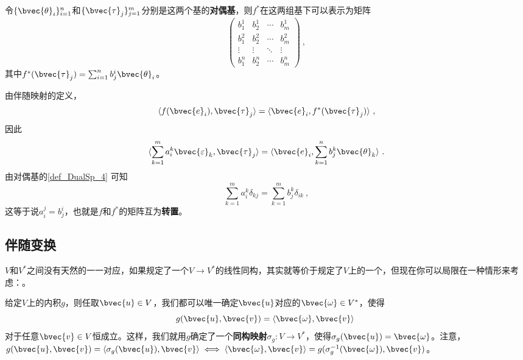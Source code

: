 令$\{\bvec{\theta}_i\}_{i=1}^n$和$\{\bvec{\tau}_j\}_{j=1}^m$分别是这两个基的\textbf{对偶基}，则$f^*$在这两组基下可以表示为矩阵
\begin{equation}
\begin{pmatrix}
b^1_1&b^1_2&\cdots&b^1_m\\
b^2_1&b^2_2&\cdots&b^2_m\\
\vdots&\vdots&\ddots&\vdots\\
b^n_1&b^n_2&\cdots&b^n_m
\end{pmatrix}~, 
\end{equation}
其中$f^*(\bvec{\tau}_j)=\sum_{i=1}^n b^i_j\bvec{\theta}_i$。

由伴随映射的定义，
\begin{equation}
\langle f(\bvec{e}_i), \bvec{\tau}_j \rangle =\langle \bvec{e}_i, f^*(\bvec{\tau}_j) \rangle ~, 
\end{equation}
因此
\begin{equation}
\langle \sum_{k=1}^m a^k_i\bvec{\varepsilon}_k, \bvec{\tau}_j \rangle =\langle \bvec{e}_i, \sum_{k=1}^n b^k_j\bvec{\theta}_k \rangle ~. 
\end{equation}
由对偶基的\autoref{def_DualSp_4} 可知
\begin{equation}
\sum_{k=1}^m a^k_i\delta_{kj} = \sum_{k=1}^m b^k_j\delta_{ik}~, 
\end{equation}
这等于说$a^j_i=b^i_j$，也就是$f$和$f^*$的矩阵互为\textbf{转置}。






\subsection{伴随变换}



$V$和$V^*$之间没有天然的一一对应，如果规定了一个$V\to V^*$的线性同构，其实就等价于规定了$V$上的一个，但现在你可以局限在一种情形来考虑：。

给定$V$上的内积$g$，则任取$\bvec{u}\in V$，我们都可以唯一确定$\bvec{u}$对应的$\bvec{\omega}\in V^*$，使得
\begin{equation}\label{eq_AdjMap_2}
g(\bvec{u}, \bvec{v}) = \langle \bvec{\omega}, \bvec{v} \rangle~
\end{equation}
对于任意$\bvec{v}\in V$恒成立。这样，我们就用$g$确定了一个\textbf{同构映射}$\sigma_g:V\to V^*$，使得$\sigma_g(\bvec{u})=\bvec{\omega}$。注意，$g(\bvec{u}, \bvec{v}) = \langle \sigma_g(\bvec{u}) , \bvec{v} \rangle \iff \langle \bvec{\omega}, \bvec{v} \rangle = g(\sigma_g^{-1}(\bvec{\omega}), \bvec{v})$。




